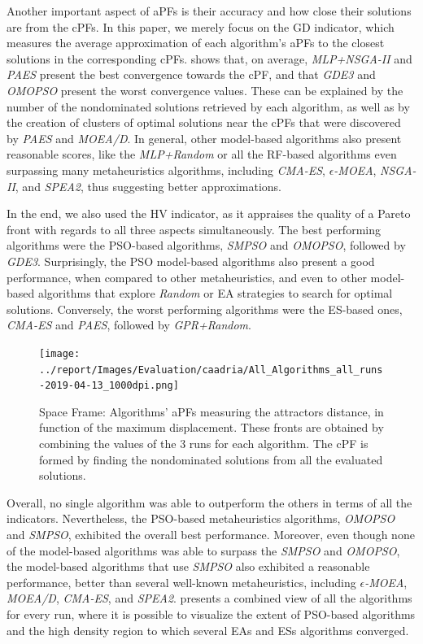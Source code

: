 Another important aspect of \acp{aPF} is their accuracy and how close their solutions are from the \acp{cPF}. In this paper, we merely focus on the \ac{GD} indicator, which measures the average approximation of each algorithm's \acp{aPF} to the closest solutions in the corresponding \acp{cPF}.  shows that, on average, \textit{MLP+NSGA-II} and \textit{PAES} present the best convergence towards the \ac{cPF}, and that \textit{GDE3} and \textit{OMOPSO} present the worst convergence values. These can be explained by the number of the nondominated solutions retrieved by each algorithm, as well as by the creation of clusters of optimal solutions near the \acp{cPF} that were discovered by \textit{PAES} and \textit{MOEA/D}. In general, other model-based algorithms also present reasonable scores, like the \textit{MLP+Random} or all the \ac{RF}-based algorithms even surpassing many metaheuristics algorithms, including \textit{CMA-ES}, $\epsilon$\textit{-MOEA}, \textit{NSGA-II}, and \textit{SPEA2}, thus suggesting better approximations.

In the end, we also used the \ac{HV} indicator, as it appraises the quality of a Pareto front with regards to all three aspects simultaneously. The best performing algorithms were the \ac{PSO}-based algorithms, \textit{SMPSO} and \textit{OMOPSO}, followed by \textit{GDE3}. Surprisingly, the \ac{PSO} model-based algorithms also present a good performance, when compared to other metaheuristics, and even to other model-based algorithms that explore \textit{Random} or \ac{EA} strategies to search for optimal solutions. Conversely, the worst performing algorithms were the \ac{ES}-based ones, \textit{CMA-ES} and \textit{PAES}, followed by \textit{GPR+Random}. 

\begin{figure}[hptb]
	\centering
	\texttt{[image: ../report/Images/Evaluation/caadria/All\_Algorithms\_all\_runs-2019-04-13\_1000dpi.png]}
	\caption{Space Frame: Algorithms' \acp{aPF} measuring the attractors distance, in function of the maximum displacement. These fronts are obtained by combining the values of the $3$ runs for each algorithm. The \ac{cPF} is formed by finding the nondominated solutions from all the evaluated solutions.}
	\label{fig:allruns}
\end{figure}

Overall, no single algorithm was able to outperform the others in terms of all the indicators. Nevertheless, the \ac{PSO}-based metaheuristics algorithms, \textit{OMOPSO} and \textit{SMPSO}, exhibited the overall best performance. Moreover, even though none of the model-based algorithms was able to surpass the \textit{SMPSO} and \textit{OMOPSO}, the model-based algorithms that use \textit{SMPSO} also exhibited a reasonable performance, better than several well-known metaheuristics, including $\epsilon$\textit{-MOEA}, \textit{MOEA/D}, \textit{CMA-ES}, and \textit{SPEA2}.  presents a combined view of all the algorithms for every run, where it is possible to visualize the extent of \ac{PSO}-based algorithms and the high density region to which several \acp{EA} and \acp{ES} algorithms converged.

